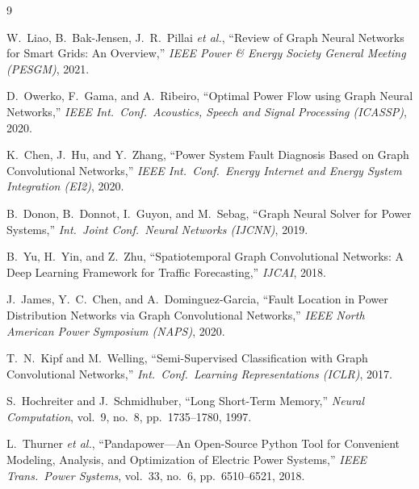 \documentclass[12pt,a4paper]{article}
\begin{document}
\begin{thebibliography}{9}

W.~Liao, B.~Bak-Jensen, J.~R.~Pillai \emph{et al.},
``Review of Graph Neural Networks for Smart Grids: An Overview,''
\emph{IEEE Power \& Energy Society General Meeting (PESGM)}, 2021.

D.~Owerko, F.~Gama, and A.~Ribeiro,
``Optimal Power Flow using Graph Neural Networks,''
\emph{IEEE Int.\ Conf.\ Acoustics, Speech and Signal Processing (ICASSP)}, 2020.

K.~Chen, J.~Hu, and Y.~Zhang,
``Power System Fault Diagnosis Based on Graph Convolutional Networks,''
\emph{IEEE Int.\ Conf.\ Energy Internet and Energy System Integration (EI2)}, 2020.

B.~Donon, B.~Donnot, I.~Guyon, and M.~Sebag,
``Graph Neural Solver for Power Systems,''
\emph{Int.\ Joint Conf.\ Neural Networks (IJCNN)}, 2019.

B.~Yu, H.~Yin, and Z.~Zhu,
``Spatiotemporal Graph Convolutional Networks: A Deep Learning Framework
for Traffic Forecasting,''
\emph{IJCAI}, 2018.

J.~James, Y.~C.~Chen, and A.~Dominguez-Garcia,
``Fault Location in Power Distribution Networks via Graph Convolutional Networks,''
\emph{IEEE North American Power Symposium (NAPS)}, 2020.

T.~N.~Kipf and M.~Welling,
``Semi-Supervised Classification with Graph Convolutional Networks,''
\emph{Int.\ Conf.\ Learning Representations (ICLR)}, 2017.

S.~Hochreiter and J.~Schmidhuber,
``Long Short-Term Memory,''
\emph{Neural Computation}, vol.~9, no.~8, pp.~1735--1780, 1997.

L.~Thurner \emph{et al.},
``Pandapower---An Open-Source Python Tool for Convenient Modeling, Analysis,
and Optimization of Electric Power Systems,''
\emph{IEEE Trans.\ Power Systems}, vol.~33, no.~6, pp.~6510--6521, 2018.

\end{thebibliography}
\end{document}
